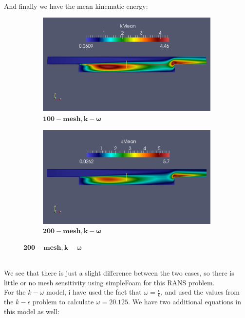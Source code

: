 \documentclass[a4paper,english,11pt,twoside]{article}
\begin{document}
\\
And finally we have the mean kinematic energy:\\
\begin{figure}[h!]
	\begin{subfigure}{0.5\textwidth}
		\includegraphics[width=0.95\linewidth]{simple_ke_10_mean_k.png}
		\caption{$\mathbf{ 100-mesh, k-\omega}$}
	\end{subfigure}
	\begin{subfigure}{0.5\textwidth}
		\includegraphics[width=0.95\linewidth]{simple_ke_20_mean_k.png}
		\caption{$\mathbf{ 200-mesh, k-\omega}$}
	\end{subfigure}
\end{figure}
\\
We see that there is just a slight difference between the two cases, so there is little or no mesh sensitivity using simpleFoam for this RANS problem.\\
\newpage
For the $k-\omega$ model, i have used the fact that $\omega = \frac{\epsilon}{k}$, and used the values from the $k-\epsilon$ problem to calculate $\omega = 20.125$. We have two additional equations in this model as well:\\
\\
\end{document}
